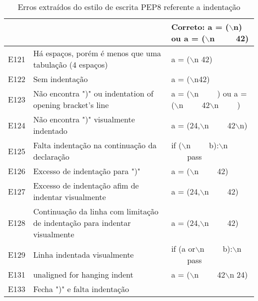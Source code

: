 \begin{table}
\begin{tabularx}{\linewidth}{ |l|X|X| }
			&
			& Correto: a = ($\backslash$n) ou a = ($\backslash$n \ \ \ \ 42) \\
			\hline
			E121
			& Há espaços, porém é menos que uma tabulação (4 espaços)
			& a = ($\backslash$n   42) \\
			\hline
			E122
			& Sem indentação
			& a = ($\backslash$n42) \\
			\hline
			E123
			& Não encontra ")" ou indentation of opening bracket's line
			& a = ($\backslash$n \ \ \ \ ) ou a = ($\backslash$n \ \ \ \ 42$\backslash$n \ \ \ \ ) \\
			\hline
			E124
			& Não encontra ")" visualmente indentado
			& a = (24,$\backslash$n \ \ \ \  42$\backslash$n) \\
			\hline
			E125
			& Falta indentação na continuação da declaração
			& if ($\backslash$n \ \ \ \ b):$\backslash$n \ \ \ \ pass \\
			\hline
			E126
			& Excesso de indentação para ")"
			& a = ($\backslash$n \ \ \ \ 42) \\
			\hline
			E127
			& Excesso de indentação afim de indentar visualmente
			& a = (24,$\backslash$n \ \ \ \   42) \\
			\hline
			E128
			& Continuação da linha com limitação de indentação para indentar visualmente
			& a = (24,$\backslash$n \ \ \ \ 42) \\
			\hline
			E129
			& Linha indentada visualmente
			& if (a or$\backslash$n \ \ \ \ b):$\backslash$n \ \ \ \ pass \\
			\hline
			E131
			& unaligned for hanging indent
			& a = ($\backslash$n \ \ \ \ 42$\backslash$n 24) \\
			\hline
			E133
			& Fecha ")" e falta indentação
			&  \\
			\hline
		\end{tabularx}
		\caption{Erros extraídos do estilo de escrita PEP8 referente a indentação}
		\label{tab:pep8E100}
	\end{table}

